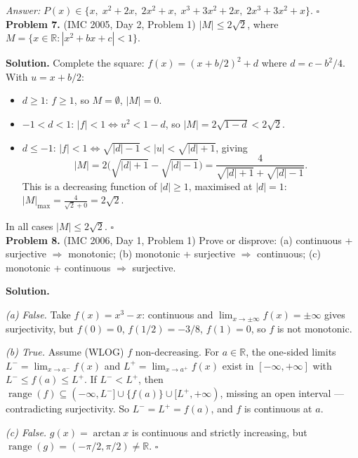 \documentclass{article}
\newcommand{\R}{\mathbb{R}}
\begin{document}
\textit{Answer:} \( P(x) \in \{x,\; x^2+2x,\; 2x^2+x,\; x^3+3x^2+2x,\; 2x^3+3x^2+x\} \). \hfill\(\square\)
\\

\textbf{Problem 7.} (IMC 2005, Day 2, Problem 1)
\( |M| \leq 2\sqrt{2} \), where \( M = \{x \in \R : |x^2+bx+c| < 1\} \).

\textbf{Solution.}
Complete the square: \( f(x) = (x + b/2)^2 + d \) where \( d = c - b^2/4 \). With \( u = x + b/2 \):
\begin{itemize}
    \item \( d \geq 1 \): \( f \geq 1 \), so \( M = \emptyset \), \( |M| = 0 \).
    \item \( -1 < d < 1 \): \( |f| < 1 \iff u^2 < 1 - d \), so \( |M| = 2\sqrt{1-d} < 2\sqrt{2} \).
    \item \( d \leq -1 \): \( |f| < 1 \iff \sqrt{|d|-1} < |u| < \sqrt{|d|+1} \), giving
    \[
    |M| = 2\bigl(\sqrt{|d|+1} - \sqrt{|d|-1}\bigr) = \frac{4}{\sqrt{|d|+1} + \sqrt{|d|-1}}.
    \]
    This is a decreasing function of \( |d| \geq 1 \), maximised at \( |d| = 1 \): \( |M|_{\max} = \frac{4}{\sqrt{2} + 0} = 2\sqrt{2} \).
\end{itemize}
In all cases \( |M| \leq 2\sqrt{2} \). \hfill\(\square\)
\\

\textbf{Problem 8.} (IMC 2006, Day 1, Problem 1)
Prove or disprove: (a) continuous + surjective \( \Rightarrow \) monotonic; (b) monotonic + surjective \( \Rightarrow \) continuous; (c) monotonic + continuous \( \Rightarrow \) surjective.

\textbf{Solution.}

\textit{(a) False.} Take \( f(x) = x^3 - x \): continuous and \( \lim_{x \to \pm\infty} f(x) = \pm\infty \) gives surjectivity, but \( f(0) = 0 \), \( f(1/2) = -3/8 \), \( f(1) = 0 \), so \( f \) is not monotonic.

\textit{(b) True.} Assume (WLOG) \( f \) non-decreasing. For \( a \in \R \), the one-sided limits \( L^- = \lim_{x \to a^-} f(x) \) and \( L^+ = \lim_{x \to a^+} f(x) \) exist in \( [-\infty, +\infty] \) with \( L^- \leq f(a) \leq L^+ \). If \( L^- < L^+ \), then \( \operatorname{range}(f) \subseteq (-\infty, L^-] \cup \{f(a)\} \cup [L^+, +\infty) \), missing an open interval — contradicting surjectivity. So \( L^- = L^+ = f(a) \), and \( f \) is continuous at \( a \).

\textit{(c) False.} \( g(x) = \arctan x \) is continuous and strictly increasing, but \( \operatorname{range}(g) = (-\pi/2, \pi/2) \neq \R \). \hfill\(\square\)
\\
\end{document}
